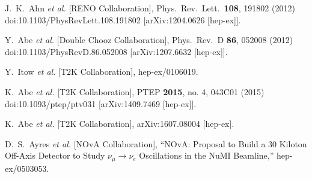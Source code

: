 \documentclass[a4 paper,12pt]{report}%
\begin{document}
\begin{thebibliography}{9}
  J.~K.~Ahn {\it et al.} [RENO Collaboration],
  Phys.\ Rev.\ Lett.\  {\bf 108}, 191802 (2012)
  doi:10.1103/PhysRevLett.108.191802
  [arXiv:1204.0626 [hep-ex]].


  Y.~Abe {\it et al.} [Double Chooz Collaboration],
  Phys.\ Rev.\ D {\bf 86}, 052008 (2012)
  doi:10.1103/PhysRevD.86.052008
  [arXiv:1207.6632 [hep-ex]].
  


  Y.~Itow {\it et al.} [T2K Collaboration],
  hep-ex/0106019.

  
  K.~Abe {\it et al.} [T2K Collaboration],
  PTEP {\bf 2015}, no. 4, 043C01 (2015)
  doi:10.1093/ptep/ptv031
  [arXiv:1409.7469 [hep-ex]].
  

  K.~Abe {\it et al.} [T2K Collaboration],
  arXiv:1607.08004 [hep-ex].
 
 

  D.~S.~Ayres {\it et al.} [NOvA Collaboration],
  ``NOvA: Proposal to Build a 30 Kiloton Off-Axis Detector to Study $\nu_{\mu} \to \nu_e$ Oscillations in the NuMI Beamline,''
  hep-ex/0503053.
  



\end{thebibliography}
\end{document}
